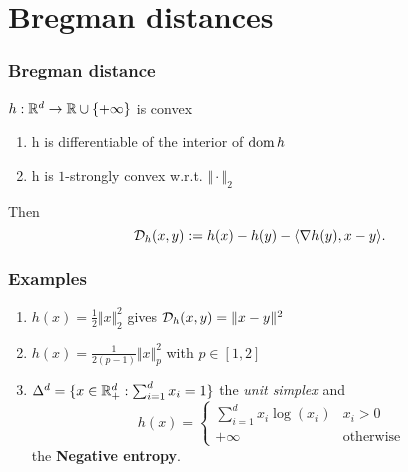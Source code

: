 \documentclass{beamer}
\begin{document}
\section{Bregman distances}%
\label{sec:}

\begin{frame}
  \frametitle{Bregman distance}
  $h: \mathbb{R}^d \to \mathbb{R} \cup \{+\infty\}$ is convex
  \begin{enumerate}
    \item h is differentiable of the interior of $\operatorname*{dom} h$
    \item h is $1$-strongly convex w.r.t. $\Vert \cdot \Vert_2$
  \end{enumerate}
  Then
  \begin{equation}
    \mathcal{D}_h(x,y) := h(x) - h(y) - \langle \nabla h(y), x-y \rangle.
  \end{equation}

\end{frame}

\begin{frame}
  \frametitle{Examples} %
  \begin{enumerate}
    \item $h(x) = \frac12 \Vert x \Vert_2^2$ gives $\mathcal{D}_h(x,y) = \Vert x-y \Vert^2$
    \item $h(x) = \frac{1}{2(p-1)} \Vert x \Vert_p^2$ with $p \in [1, 2]$
    \item  $\Delta^d= \{x \in \mathbb{R}^d_+ : \sum_{i=1}^{d}x_i = 1\}$ the \emph{unit simplex} and
          \begin{equation}
            h(x) =
            \begin{cases}
              \sum_{i=1}^{d} x_i \log(x_i) & x_i > 0 \\
              +\infty & \text{otherwise}
            \end{cases}
          \end{equation}
          the \textbf{Negative entropy}.\\
  \end{enumerate}
\end{frame}
\end{document}
